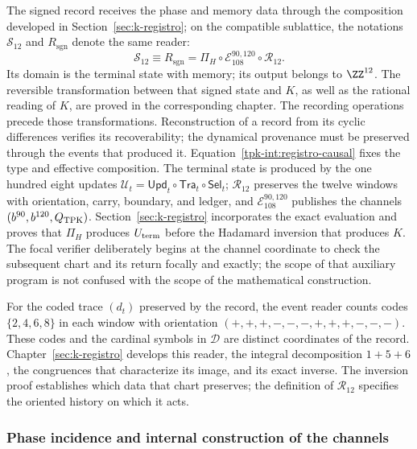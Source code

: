 The signed record receives the phase and memory data through the
composition developed in Section~\ref{sec:k-registro}; on the
compatible sublattice, the notations \(\mathcal S_{12}\) and
\(R_{\mathrm{sgn}}\) denote the same reader:
\begin{equation}
 \mathcal S_{12}\equiv R_{\mathrm{sgn}}
 =\Pi_H\circ\mathcal E_{108}^{90,120}
                         \circ\mathcal R_{12}.
 \label{tpk-int:registro-causal}
\end{equation}
Its domain is the terminal state with memory; its output belongs to
\(\ZZ^{12}\). The reversible transformation between that signed state
and \(K\), as well as the rational reading of \(K\), are proved in
the corresponding chapter. The recording operations precede
those transformations. Reconstruction of a record from its cyclic
differences verifies its recoverability; the dynamical provenance
must be preserved through the events that produced it.
Equation~\eqref{tpk-int:registro-causal} fixes the type and effective
composition. The terminal state is produced by the one hundred eight updates
\(\mathcal U_t=\mathsf{Upd}_t\circ\mathsf{Tra}_t\circ\mathsf{Sel}_t\);
\(\mathcal R_{12}\) preserves the twelve windows with orientation, carry,
boundary, and ledger, and \(\mathcal E_{108}^{90,120}\) publishes the channels
\((b^{90},b^{120},Q_{\rm TPK})\). Section~\ref{sec:k-registro}
incorporates the exact evaluation and proves that
\(\Pi_H\) produces \(U_{\rm term}\) before the Hadamard inversion that
produces \(K\). The focal verifier deliberately begins at the channel
coordinate to check the subsequent chart and its return focally and exactly;
the scope of that auxiliary program is not confused with the scope of
the mathematical construction.

For the coded trace \((d_t)\) preserved by the record, the
event reader counts codes \(\{2,4,6,8\}\) in each
window with orientation
\((+,+,+,-,-,-,+,+,+,-,-,-)\). These codes and the cardinal
symbols in \(\mathcal D\) are distinct coordinates of the
record. Chapter~\ref{sec:k-registro} develops this reader,
the integral decomposition \(1+5+6\), the congruences that
characterize its image, and its exact inverse. The inversion proof
establishes which data that chart preserves; the definition of
\(\mathcal R_{12}\) specifies the oriented history on which it
acts.

\subsubsection{Phase incidence and internal construction of the channels}
\label{tpk-int:incidencia}

